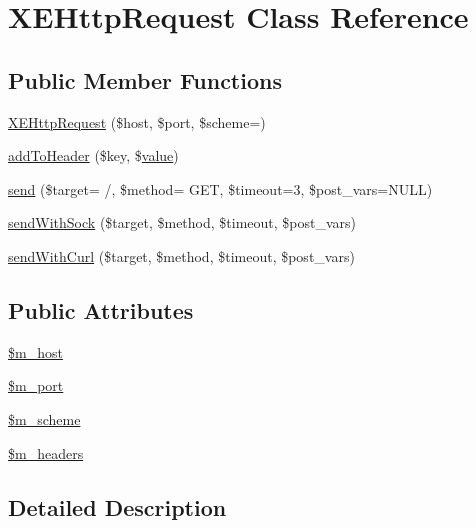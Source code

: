 \hypertarget{classXEHttpRequest}{}\section{X\+E\+Http\+Request Class Reference}
\label{classXEHttpRequest}
\subsection*{Public Member Functions}
\begin{DoxyCompactItemize}
\item 
\hyperlink{classXEHttpRequest_aa8a672ad4e5c3cc8d3b7a9cecc29d349}{X\+E\+Http\+Request} (\$host, \$port, \$scheme=\textquotesingle{}\textquotesingle{})
\item 
\hyperlink{classXEHttpRequest_af936bdc66e6dcabbd8934afc5e210063}{add\+To\+Header} (\$key, \$\hyperlink{jquery_8js_abe5393d870043cf6aaa1d5ad5fce755c}{value})
\item 
\hyperlink{classXEHttpRequest_a8f75aef64b09a7b2d007bdce562eaaf6}{send} (\$target= \textquotesingle{}/\textquotesingle{}, \$method= \textquotesingle{}G\+ET\textquotesingle{}, \$timeout=3, \$post\+\_\+vars=N\+U\+LL)
\item 
\hyperlink{classXEHttpRequest_a9e316ec4c68dfe9a124327287dae2754}{send\+With\+Sock} (\$target, \$method, \$timeout, \$post\+\_\+vars)
\item 
\hyperlink{classXEHttpRequest_ae6412b6f079b88a67f43602d3cdae2d7}{send\+With\+Curl} (\$target, \$method, \$timeout, \$post\+\_\+vars)
\end{DoxyCompactItemize}
\subsection*{Public Attributes}
\begin{DoxyCompactItemize}
\item 
\hyperlink{classXEHttpRequest_ad88148dced2b42017a96b2a5dd0b533a}{\$m\+\_\+host}
\item 
\hyperlink{classXEHttpRequest_a35c62f61b5ad2c200c53a58dd43a2784}{\$m\+\_\+port}
\item 
\hyperlink{classXEHttpRequest_a501919f00934ef2cc76300fa32c2f19d}{\$m\+\_\+scheme}
\item 
\hyperlink{classXEHttpRequest_a36df236b46af2f09dd9020096dbaed22}{\$m\+\_\+headers}
\end{DoxyCompactItemize}


\subsection{Detailed Description}



